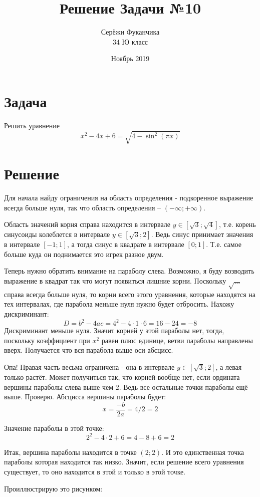 \documentclass{article}
\title{Решение Задачи №10}
\author{Серёжи Фуканчика\\34 Ю класс}
\date{Ноябрь 2019}
\begin{document}
\maketitle

\section{Задача}
Решить уравнение
$$x^2-4x+6=\sqrt{4-\sin^2{(\pi{}x)}}$$

\section{Решение}
Для начала найду ограничения на область определения - подкоренное выражение всегда больше нуля, так что область определения -- $(-\infty;+\infty)$.

Область значений корня справа находится в интервале $y\in[\sqrt{3};\sqrt{4}]$, т.е. корень синусоиды колеблется в интервале  $y\in[\sqrt{3};2]$. Ведь синус принимает значения в интервале $[-1;1]$, а тогда синус в квадрате в интервале $[0;1]$. Т.е. самое больше куда он поднимается это игрек разное двум.

Теперь нужно обратить внимание на параболу слева. Возможно, я буду возводить выражение в квадрат так что могут появиться лишние корни. Поскольку $\sqrt{\ldots}$ справа всегда больше нуля, то корни всего этого уравнения, которые находятся на тех интервалах, где парабола меньше нуля нужно будет отбросить. Нахожу дискриминант:
$$D=b^2-4{}a{}c=4^2-4\cdot{}1\cdot{}6=16-24=-8$$
Дискриминант меньше нуля. Значит корней у этой параболы нет, тогда, поскольку коэффициент при $x^2$ равен плюс единице, ветви параболы направлены вверх. Получается что вся парабола выше оси абсцисс.

Опа! Правая часть весьма ограничена - она в интервале $y\in[\sqrt{3};2]$, а левая только растёт. Может получиться так, что корней вообще нет, если ордината вершины параболы слева выше чем $2$. Ведь все остальные точки параболы ещё выше. Проверю. Абсцисса вершины параболы будет:
$$x=\frac{-b}{2a}=4/2=2$$

Значение параболы в этой точке:
$$2^2-4\cdot{}2+6=4-8+6=2$$

Итак, вершина параболы находится в точке $(2;2)$. И это единственная точка параболы которая находится так низко. Значит, если решение всего уравнения существует, то оно находится в этой и только в этой точке.

Проиллюстрирую это рисунком:
\begin{center}
\end{center}
\end{document}
